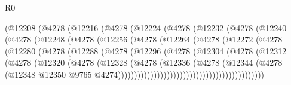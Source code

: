 \begin{lexlean}{R0}
\begin{coremodule}
                    (@12208
                      (@4278
                        (@12216
                          (@4278
                            (@12224
                              (@4278
                                (@12232
                                  (@4278
                                    (@12240
                                      (@4278
                                        (@12248
                                          (@4278
                                            (@12256
                                              (@4278
                                                (@12264
                                                  (@4278
                                                    (@12272
                                                      (@4278
                                                        (@12280
                                                          (@4278
                                                            (@12288
                                                              (@4278
                                                                (@12296
                                                                  (@4278
                                                                    (@12304
                                                                      (@4278
                                                                        (@12312
                                                                          (@4278
                                                                            (@12320
                                                                              (@4278
                                                                                (@12328
                                                                                  (@4278
                                                                                    (@12336
                                                                                      (@4278
                                                                                        (@12344
                                                                                          (@4278
                                                                                            (@12348
                                                                                              @12350
                                                                                              @9765
                                                                                              @4274)))))))))))))))))))))))))))))))))))))))))))))

\end{coremodule}
\end{lexlean}

